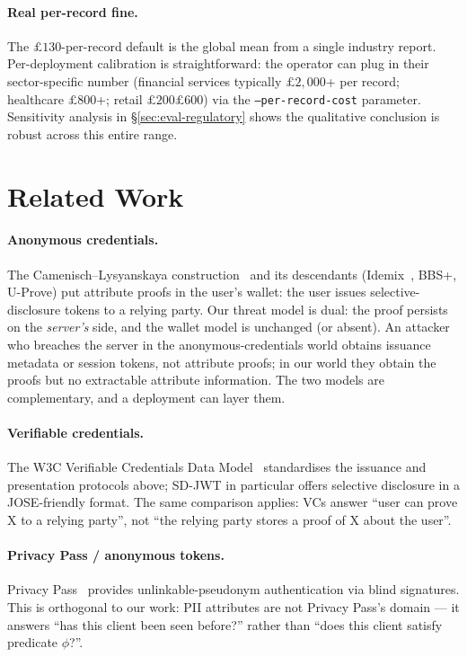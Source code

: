 \documentclass[11pt,a4paper]{article}
\begin{document}
\paragraph{Real per\nobreakdash-record fine.}  The
$\pounds 130$\nobreakdash-per\nobreakdash-record default is the global
mean from a single industry report.  Per\nobreakdash-deployment
calibration is straightforward: the operator can plug in their
sector\nobreakdash-specific number (financial services typically
$\pounds 2{,}000$+ per record; healthcare $\pounds 800$+; retail
$\pounds 200$\textendash$\pounds 600$) via the
\texttt{--per-record-cost} parameter.  Sensitivity analysis in
\S\ref{sec:eval-regulatory} shows the qualitative conclusion is
robust across this entire range.

\section{Related Work}
\label{sec:related}

\paragraph{Anonymous credentials.}  The Camenisch--Lysyanskaya
construction~\cite{cl-2001} and its descendants
(Idemix~\cite{idemix}, BBS+, U\nobreakdash-Prove) put attribute
proofs in the user's wallet: the user issues
selective\nobreakdash-disclosure tokens to a relying party.
Our threat model is dual: the proof persists on the
\emph{server's} side, and the wallet model is unchanged
(or absent).  An attacker who breaches the server in the
anonymous\nobreakdash-credentials world obtains issuance metadata
or session tokens, not attribute proofs; in our world they
obtain the proofs but no extractable attribute information.  The
two models are complementary, and a deployment can layer them.

\paragraph{Verifiable credentials.}  The W3C Verifiable
Credentials Data Model~\cite{w3c-vc} standardises the issuance
and presentation protocols above; SD\nobreakdash-JWT in particular
offers selective disclosure in a JOSE\nobreakdash-friendly format.
The same comparison applies: VCs answer ``user can prove X to a
relying party'', not ``the relying party stores a proof of X
about the user''.

\paragraph{Privacy Pass / anonymous tokens.}  Privacy
Pass~\cite{privacy-pass} provides unlinkable\nobreakdash-pseudonym
authentication via blind signatures.  This is orthogonal to our
work: PII attributes are not Privacy Pass's domain — it answers
``has this client been seen before?'' rather than ``does this
client satisfy predicate $\phi$?''.
\end{document}
